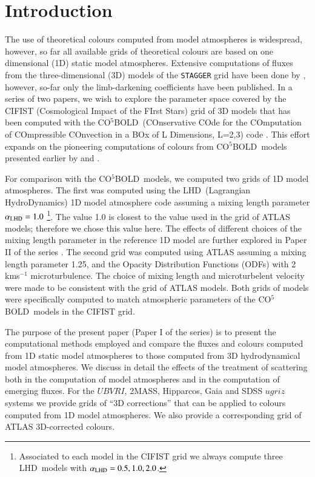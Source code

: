 \documentclass[]{aa}
\newcommand{\cobold}{{\sf CO$^5$BOLD}}
\renewcommand{\lhd}{{\sf LHD}}
\begin{document}
\section{Introduction}

The use of theoretical colours computed from model atmospheres
is widespread, however, so far all available
grids of theoretical colours \citep[e.g.][]{Bessel98,Castelli99,onehag,Casagrande14}
are based on one dimensional (1D) static model atmospheres. 
Extensive computations of fluxes from the three-dimensional (3D) models of the 
{\tt STAGGER} grid \citep{Magic1} have been done by
\citet{Magic4}, however, so-far only the limb-darkening coefficients
have been published.
In a series of two  papers, we wish to explore
the parameter space covered by  
the CIFIST (Cosmological Impact of the FIrst Stars)  
grid of 3D  models \citep[][and Ludwig et al., in preparation]{cifist09} 
that has been computed with the \cobold\ (COnservative COde for the COmputation of COmpressible COnvection in a BOx of L Dimensions, L=2,3) 
code \citep{FSL12}.
This effort expands on the pioneering computations of colours 
from \cobold\ models  presented earlier 
by \citet{KHL05} and \citet{KLC09}.

For comparison with the \cobold\ models, 
we computed two grids of 1D model atmospheres. 
The first was computed using the \lhd\  (Lagrangian HydroDynamics) 1D model atmosphere code 
\citep{CL07} assuming a mixing length parameter $\rm\alpha_{LHD} = 1.0$ 
\footnote{Associated to  each model in the CIFIST grid we always compute
three \lhd\ models with  $\rm\alpha_{LHD} = 0.5, 1.0, 2.0$.  }. 
 The value 1.0
is closest to the value used in the \citet{CK03} grid of ATLAS models; therefore
we chose this value here. The effects of different choices
of the mixing length parameter  in the reference  1D model are further explored in Paper II of the series \citep{paper2}. 
The second grid was computed using ATLAS \citep{K05} assuming a mixing length parameter 1.25,
and the \citet{CK03} Opacity Distribution Functions (ODFs)
with 2\,kms$^{-1}$ microturbulence.  The choice of mixing
length and microturbelent velocity were made to be consistent
with the  \citet{CK03} grid of ATLAS models.
Both grids of models were specifically 
computed to match atmospheric parameters of the \cobold\ models 
in the CIFIST grid.

The purpose of the present  paper (Paper I of the series) 
is to present the computational methods employed and compare the fluxes and
colours computed from 1D static model atmospheres to those computed
from 3D hydrodynamical model atmospheres.
We discuss in detail the effects of the treatment of scattering both
in the computation of model atmospheres and in the computation of emerging
fluxes. 
For the $UBVRI$, 2MASS, Hipparcos, Gaia and SDSS $ugriz$
systems we provide grids of ``3D corrections'' that can be applied to 
colours computed from 1D model atmospheres. We also provide a corresponding
grid of ATLAS 3D-corrected colours.
\end{document}
